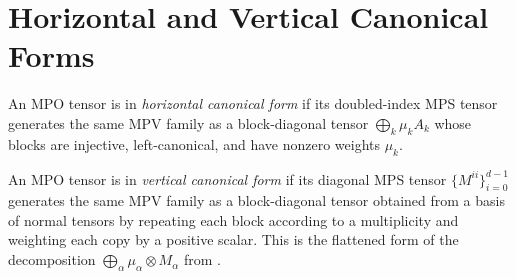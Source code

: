 \section{Horizontal and Vertical Canonical Forms}

\begin{definition}\label{def:horizontal_cf_mpdo}
    \notready
    An MPO tensor is in \emph{horizontal canonical form} if its doubled-index
    MPS tensor generates the same MPV family as a block-diagonal tensor
    $\bigoplus_k \mu_k A_k$ whose blocks are injective, left-canonical, and
    have nonzero weights $\mu_k$.
\end{definition}

\begin{definition}\label{def:vertical_cf_mpdo}
    \notready
    An MPO tensor is in \emph{vertical canonical form} if its diagonal MPS
    tensor $\{M^{ii}\}_{i=0}^{d-1}$ generates the same MPV family as a
    block-diagonal tensor obtained from a basis of normal tensors by repeating
    each block according to a multiplicity and weighting each copy by a
    positive scalar.
    This is the flattened form of the decomposition
    $\bigoplus_\alpha \mu_\alpha \otimes M_\alpha$
    from \cite[Proposition~4.13]{Cirac2016MPDO_arXiv}.
\end{definition}

